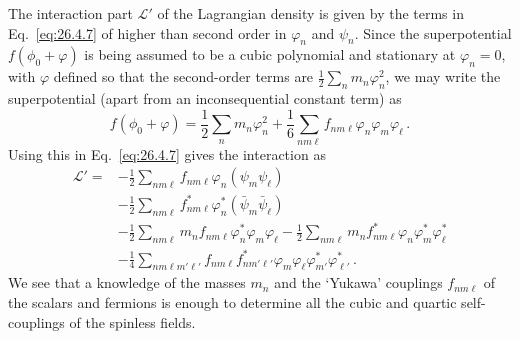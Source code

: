 The interaction part \(\mathcal{L}'\) of the Lagrangian density is given by the
terms in Eq.~\eqref{eq:26.4.7} of higher than second order in \(\varphi_n\) and
\(\psi_n\). Since the superpotential \(f(\phi_0+\varphi)\) is being assumed to
be a cubic polynomial and stationary at \(\varphi_n=0\), with \(\varphi\)
defined so that the second-order terms are
\(\frac12\sum_n m_n\varphi_n^2\), we may write the superpotential (apart from
an inconsequential constant term) as
\begin{equation}
  f(\phi_0+\varphi)
  =\frac12\sum_n m_n\varphi_n^2
  +\frac16\sum_{nm\ell}f_{nm\ell}\varphi_n\varphi_m\varphi_\ell\,.
  \tag{26.4.16}\label{eq:26.4.16}
\end{equation}
Using this in Eq.~\eqref{eq:26.4.7} gives the interaction as
\begin{equation}
  \begin{aligned}
  \mathcal{L}'={}&
  -\frac12\sum_{nm\ell}f_{nm\ell}\varphi_n
    (\psi_m\psi_\ell)
  \\
  &-\frac12\sum_{nm\ell}f_{nm\ell}^*\varphi_n^*
    (\bar\psi_m\bar\psi_\ell)
  \\
  &-\frac12\sum_{nm\ell}m_nf_{nm\ell}
    \varphi_n^*\varphi_m\varphi_\ell
  -\frac12\sum_{nm\ell}m_nf_{nm\ell}^*
    \varphi_n\varphi_m^*\varphi_\ell^*
  \\
  &-\frac14\sum_{nm\ell m'\ell'}
    f_{nm\ell}f_{nm'\ell'}^*
    \varphi_m\varphi_\ell\varphi_{m'}^*\varphi_{\ell'}^*\,.
  \end{aligned}
  \tag{26.4.17}\label{eq:26.4.17}
\end{equation}
We see that a knowledge of the masses \(m_n\) and the `Yukawa' couplings
\(f_{nm\ell}\) of the scalars and fermions is enough to determine all the cubic
and quartic self-couplings of the spinless fields.

